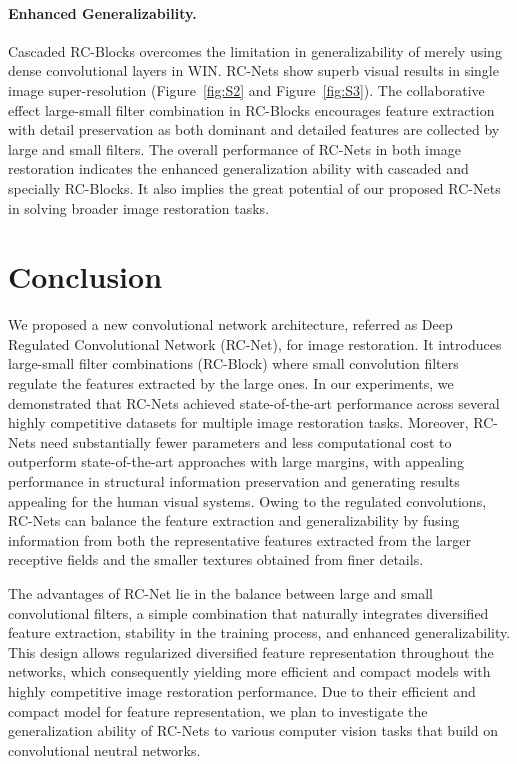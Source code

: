 \documentclass[10pt,twocolumn,letterpaper]{article}
\begin{document}
\paragraph{Enhanced Generalizability.} Cascaded RC-Blocks overcomes the limitation in generalizability of merely using dense convolutional layers in WIN. RC-Nets show superb visual results in single image super-resolution (Figure~\ref{fig:S2} and Figure~\ref{fig:S3}). The collaborative effect large-small filter combination in RC-Blocks encourages feature extraction with detail preservation as both dominant and detailed features are collected by large and small filters. The overall performance of RC-Nets in both image restoration indicates the enhanced generalization ability with cascaded and specially RC-Blocks. It also implies the great potential of our proposed RC-Nets in solving broader image restoration tasks. 




\section{Conclusion}
We proposed a new convolutional network architecture,
referred as Deep Regulated Convolutional Network
(RC-Net), for image restoration. It introduces large-small filter combinations (RC-Block) where small convolution filters regulate the features extracted by the large ones. In our experiments, we demonstrated that RC-Nets achieved state-of-the-art performance across several highly competitive datasets for multiple image restoration tasks. Moreover, RC-Nets need substantially fewer parameters and less computational cost to outperform state-of-the-art approaches with large margins, with appealing performance in structural information preservation and generating results appealing for the human visual systems.   Owing to the regulated convolutions, RC-Nets can balance the feature extraction and generalizability by fusing information from both the representative features extracted from the larger receptive fields and the smaller textures obtained from finer details. 


The advantages of RC-Net lie in the balance between large and small convolutional filters, a simple combination that naturally integrates diversified feature extraction, stability in the training process, and enhanced generalizability. This design allows regularized diversified feature representation throughout the networks, which consequently yielding more efficient and compact models with highly competitive image restoration performance. Due to their efficient and compact model for feature representation, we plan to investigate the generalization ability of RC-Nets to various computer vision tasks that build on convolutional neutral networks. 
\end{document}
